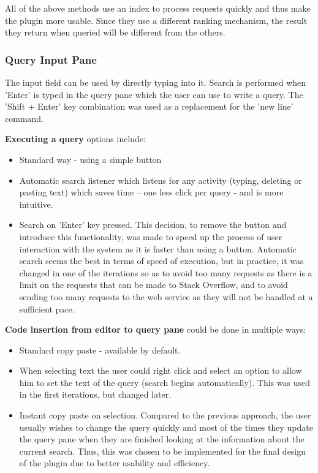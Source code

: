 \documentclass{l4proj}
\begin{document}
\noindent
All of the above methods use an index to process requests quickly and thus make the plugin more usable. Since they use a different ranking mechanism, the result they return when queried will be different from the others.

\subsubsection{Query Input Pane}
The input field can be used by directly typing into it. Search is performed when 'Enter' is typed in the query pane which the user can use to write a query. The 'Shift + Enter' key combination was used as a replacement for the 'new line' command.

\textbf{Executing a query} options include:
\begin{itemize}
\item Standard way - using a simple button
\item Automatic search listener which listens for any activity (typing, deleting or pasting text) which saves time – one less click per query - and is more intuitive.
\item Search on 'Enter' key pressed. This decision, to remove the button and introduce this functionality, was made to speed up the process of user interaction with the system as it is faster than using a button. Automatic search seems the best in terms of speed of execution, but in practice, it was changed in one of the iterations so as to avoid too many requests as there is a limit on the requests that can be made to Stack Overflow, and to avoid sending too many requests to the web service as they will not be handled at a sufficient pace.
\end{itemize}

\textbf{Code insertion from editor to query pane} could be done in multiple ways:

\begin{itemize}
\item Standard copy paste - available by default.
\item When selecting text the user could right click and select an option to allow him to set the text of the query (search begins automatically). This was used in the first iterations, but changed later.   
\item Instant copy paste on selection. Compared to the previous approach, the user usually wishes to change the query quickly and most of the times they update the query pane when they are finished looking at the information about the current search. Thus, this was chosen to be implemented for the final design of the plugin due to better usability and efficiency.
\end{itemize}
\end{document}
